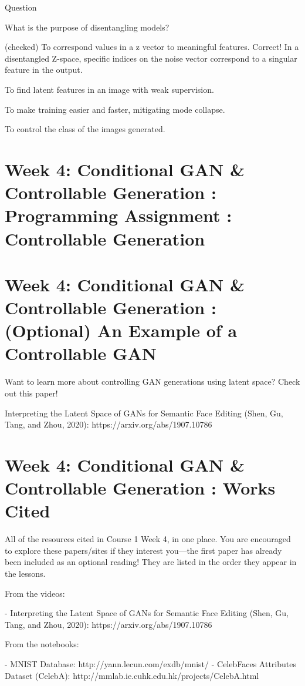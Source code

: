 \documentclass[11pt, onecolumn]{article}
\begin{document}
Question

What is the purpose of disentangling models?

(checked) To correspond values in a z vector to meaningful features.
Correct! In a disentangled Z-space, specific indices on the noise vector correspond to a singular feature in the output.

To find latent features in an image with weak supervision.

To make training easier and faster, mitigating mode collapse.

To control the class of the images generated.

\section{Week 4: Conditional GAN \& Controllable Generation : Programming Assignment : Controllable Generation}


\section{Week 4: Conditional GAN \& Controllable Generation : (Optional) An Example of a Controllable GAN}

Want to learn more about controlling GAN generations using latent space? Check out this paper!

Interpreting the Latent Space of GANs for Semantic Face Editing (Shen, Gu, Tang, and Zhou, 2020): https://arxiv.org/abs/1907.10786

\section{Week 4: Conditional GAN \& Controllable Generation : Works Cited}

All of the resources cited in Course 1 Week 4, in one place. You are encouraged to explore these papers/sites if they interest you—the first paper has already been included as an optional reading! They are listed in the order they appear in the lessons.

From the videos:

- Interpreting the Latent Space of GANs for Semantic Face Editing (Shen, Gu, Tang, and Zhou, 2020): https://arxiv.org/abs/1907.10786

From the notebooks:

- MNIST Database: http://yann.lecun.com/exdb/mnist/
- CelebFaces Attributes Dataset (CelebA): http://mmlab.ie.cuhk.edu.hk/projects/CelebA.html
\end{document}

